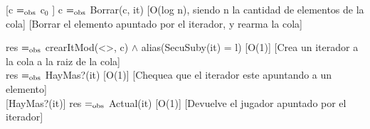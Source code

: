[c $=_{\mathrm{obs}}$ c$_0$ ]
{c $=_{\mathrm{obs}}$ Borrar(c, it)}
[O(log n), siendo n la cantidad de elementos de la cola]
[Borrar el elemento apuntado por el iterador, y rearma la cola]\\


{res $=_{\mathrm{obs}}$ crearItMod(<>, c) $\wedge$ alias(SecuSuby(it) = l)}
[O(1)]
[Crea un iterador a la cola a la raiz de la cola]\\

{res $=_{\mathrm{obs}}$ HayMas?(it)}
[O(1)]
[Chequea que el iterador este apuntando a un elemento]\\

[HayMas?(it)]
{res $=_{\mathrm{obs}}$ Actual(it)}
[O(1)]
[Devuelve el jugador apuntado por el iterador]\\

